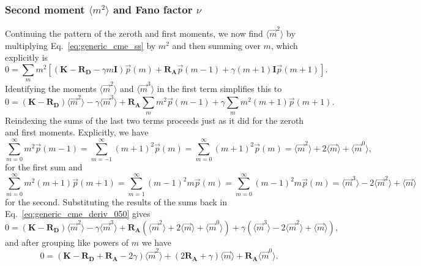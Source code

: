 \subsubsection{Second moment $\langle{m}^2\rangle$ and Fano factor $\nu$}
Continuing the pattern of the zeroth and first moments, we now find
$\langle\vec{m}^2\rangle$ by multiplying Eq.~\ref{eq:generic_cme_ss} by $m^2$
and then summing over $m$, which explicitly is
\begin{equation}
0 = \sum_m m^2 \left[
\left( \mathbf{K} - \mathbf{R_D} - \gamma m \mathbf{I} \right) \vec{p}(m)
            + \mathbf{R_A} \vec{p}(m-1) +
            \gamma (m+1) \mathbf{I} \vec{p}(m+1)
\right].
\end{equation}
Identifying the moments $\langle\vec{m}^2\rangle$ and $\langle\vec{m}^3\rangle$
in the first term simplifies this to
\begin{equation}
0 = (\mathbf{K} - \mathbf{R_D}) \langle\vec{m}^2\rangle
    - \gamma \langle\vec{m}^3\rangle + \mathbf{R_A} \sum_m m^2\vec{p}(m-1)
    + \gamma \sum_m m^2(m+1)\vec{p}(m+1).
\label{eq:generic_cme_deriv_050}
\end{equation}
Reindexing the sums of the last two terms proceeds just as it did for the zeroth
and first moments. Explicitly, we have
\begin{equation}
\sum_{m=0}^\infty m^2\vec{p}(m-1)
= \sum_{m=-1}^\infty (m+1)^2\vec{p}(m)
= \sum_{m=0}^\infty (m+1)^2\vec{p}(m)
= \langle\vec{m}^2\rangle + 2\langle\vec{m}\rangle + \langle\vec{m}^0\rangle,
\end{equation}
for the first sum and
\begin{equation}
\sum_{m=0}^\infty m^2(m+1)\vec{p}(m+1)
= \sum_{m=1}^\infty (m-1)^2m\vec{p}(m)
= \sum_{m=0}^\infty (m-1)^2 m\vec{p}(m)
= \langle\vec{m}^3\rangle - 2\langle\vec{m}^2\rangle + \langle\vec{m}\rangle
\end{equation}
for the second. Substituting the results of the sums back in
Eq.~\ref{eq:generic_cme_deriv_050} gives
\begin{equation}
0 = (\mathbf{K} - \mathbf{R_D}) \langle\vec{m}^2\rangle
- \gamma \langle\vec{m}^3\rangle
+ \mathbf{R_A}
    (\langle\vec{m}^2\rangle + 2\langle\vec{m}\rangle + \langle\vec{m}^0\rangle)
+ \gamma
    (\langle\vec{m}^3\rangle - 2\langle\vec{m}^2\rangle + \langle\vec{m}\rangle),
\end{equation}
and after grouping like powers of $m$ we have
\begin{equation}
0 = (\mathbf{K} - \mathbf{R_D} + \mathbf{R_A} - 2\gamma) \langle\vec{m}^2\rangle
+ (2\mathbf{R_A} + \gamma) \langle\vec{m}\rangle
+ \mathbf{R_A} \langle\vec{m}^0\rangle.
\label{eq:generic_cme_deriv_060}
\end{equation}
